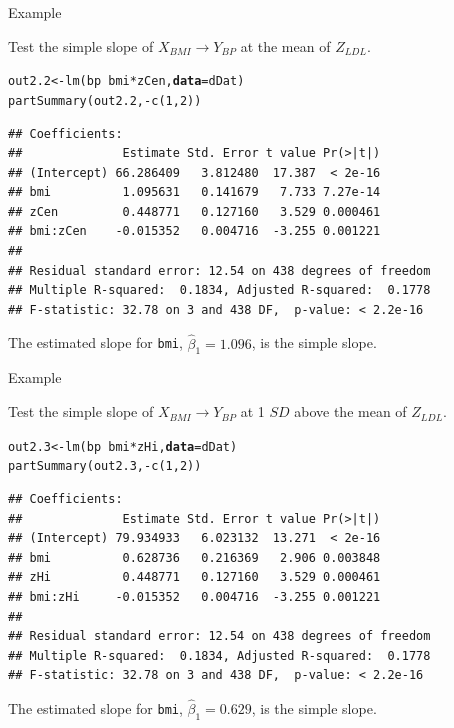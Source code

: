 \documentclass{beamer}\usepackage[]{graphicx}\usepackage[]{color}
\makeatletter
\newcommand{\hlnum}[1]{\textcolor[rgb]{0.69,0.494,0}{#1}}%
\newcommand{\hlopt}[1]{\textcolor[rgb]{0,0,0}{#1}}%
\newcommand{\hlstd}[1]{\textcolor[rgb]{0,0,0}{#1}}%
\newcommand{\hlkwb}[1]{\textcolor[rgb]{0,0.341,0.682}{#1}}%
\newcommand{\hlkwc}[1]{\textcolor[rgb]{0,0,0}{\textbf{#1}}}%
\newcommand{\hlkwd}[1]{\textcolor[rgb]{0.004,0.004,0.506}{#1}}%
\newenvironment{kframe}{%
 \def\at@end@of@kframe{}%
 \ifinner\ifhmode%
  \def\at@end@of@kframe{\end{minipage}}%
  \begin{minipage}{\columnwidth}%
 \fi\fi%
 \def\FrameCommand##1{\hskip\@totalleftmargin \hskip-\fboxsep
 \colorbox{shadecolor}{##1}\hskip-\fboxsep
     \hskip-\linewidth \hskip-\@totalleftmargin \hskip\columnwidth}%
 \MakeFramed {\advance\hsize-\width
   \@totalleftmargin\z@ \linewidth\hsize
   \@setminipage}}%
 {\par\unskip\endMakeFramed%
 \at@end@of@kframe}
\newenvironment{knitrout}{}{} %
\makeatother
\begin{document}
\begin{frame}[fragile]{Example}

  Test the simple slope of $X_{BMI} \rightarrow Y_{BP}$ at the mean of $Z_{LDL}$.
\begin{knitrout}\footnotesize
{}\color{fgcolor}\begin{kframe}
\begin{alltt}
\hlstd{out2.2} \hlkwb{<-} \hlkwd{lm}\hlstd{(bp} \hlopt{~} \hlstd{bmi}\hlopt{*}\hlstd{zCen,} \hlkwc{data} \hlstd{= dDat)}
\hlkwd{partSummary}\hlstd{(out2.2,} \hlopt{-}\hlkwd{c}\hlstd{(}\hlnum{1}\hlstd{,} \hlnum{2}\hlstd{))}
\end{alltt}
\begin{verbatim}
## Coefficients:
##              Estimate Std. Error t value Pr(>|t|)
## (Intercept) 66.286409   3.812480  17.387  < 2e-16
## bmi          1.095631   0.141679   7.733 7.27e-14
## zCen         0.448771   0.127160   3.529 0.000461
## bmi:zCen    -0.015352   0.004716  -3.255 0.001221
## 
## Residual standard error: 12.54 on 438 degrees of freedom
## Multiple R-squared:  0.1834,	Adjusted R-squared:  0.1778 
## F-statistic: 32.78 on 3 and 438 DF,  p-value: < 2.2e-16
\end{verbatim}
\end{kframe}
\end{knitrout}
The estimated slope for \texttt{bmi}, $\hat{\beta}_1 = 
1.096$, is the simple slope.
 
\end{frame}


\begin{frame}[fragile]{Example}
  
  Test the simple slope of $X_{BMI} \rightarrow Y_{BP}$ at 1 $SD$ above the mean 
  of $Z_{LDL}$.
\begin{knitrout}\footnotesize
{}\color{fgcolor}\begin{kframe}
\begin{alltt}
\hlstd{out2.3} \hlkwb{<-} \hlkwd{lm}\hlstd{(bp} \hlopt{~} \hlstd{bmi}\hlopt{*}\hlstd{zHi,} \hlkwc{data} \hlstd{= dDat)}
\hlkwd{partSummary}\hlstd{(out2.3,} \hlopt{-}\hlkwd{c}\hlstd{(}\hlnum{1}\hlstd{,} \hlnum{2}\hlstd{))}
\end{alltt}
\begin{verbatim}
## Coefficients:
##              Estimate Std. Error t value Pr(>|t|)
## (Intercept) 79.934933   6.023132  13.271  < 2e-16
## bmi          0.628736   0.216369   2.906 0.003848
## zHi          0.448771   0.127160   3.529 0.000461
## bmi:zHi     -0.015352   0.004716  -3.255 0.001221
## 
## Residual standard error: 12.54 on 438 degrees of freedom
## Multiple R-squared:  0.1834,	Adjusted R-squared:  0.1778 
## F-statistic: 32.78 on 3 and 438 DF,  p-value: < 2.2e-16
\end{verbatim}
\end{kframe}
\end{knitrout}
The estimated slope for \texttt{bmi}, $\hat{\beta}_1 = 
0.629$, is the simple slope.
 
\end{frame}
\end{document}
